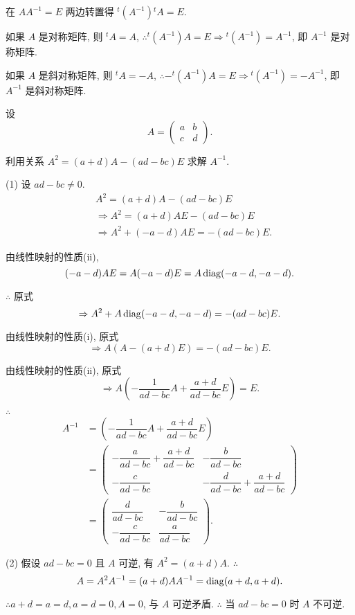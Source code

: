 \documentclass[color=black,device=normal,lang=cn,mode=geye]{elegantnote}
\begin{document}
\begin{solution}
    在 $AA^{-1}=E$ 两边转置得 ${}^t(A^{-1}){}^tA=E$.

    如果 $A$ 是对称矩阵, 则 ${}^tA=A$, $\therefore{}^t(A^{-1})A=E\Rightarrow{}^t(A^{-1})=A^{-1}$, 即 $A^{-1}$ 是对称矩阵.

    如果 $A$ 是斜对称矩阵, 则 ${}^tA=-A$, $\therefore-{}^t(A^{-1})A=E\Rightarrow{}^t(A^{-1})=-A^{-1}$, 即 $A^{-1}$ 是斜对称矩阵.
\end{solution}
\setcounter{exercise}{13}
\begin{exercise}%
    设
    \[A=\begin{pmatrix}
        a & b \\
        c & d
    \end{pmatrix}.\]
    
    利用关系 $A^2=(a+d)A-(ad-bc)E$ 求解 $A^{-1}$.
\end{exercise}
\begin{solution}
    (1) 设 $ad-bc\neq0$.
    \begin{align*}
        & A^2=(a+d)A-(ad-bc)E \\
        & \Rightarrow A^2=(a+d)AE-(ad-bc)E \\
        & \Rightarrow A^2+(-a-d)AE=-(ad-bc)E.
    \end{align*}

    由线性映射的性质(ii),
    \[(-a-d)AE=A(-a-d)E=A\operatorname{diag}(-a-d,-a-d).\]

    $\therefore$ 原式
    \[\Rightarrow A^2+A\operatorname{diag}(-a-d,-a-d)=-(ad-bc)E.\]

    由线性映射的性质(i), 原式
    \[\Rightarrow A(A-(a+d)E)=-(ad-bc)E.\]

    由线性映射的性质(ii), 原式
    \[\Rightarrow A\left(-\dfrac{1}{ad-bc}A+\dfrac{a+d}{ad-bc}E\right)=E.\]

    $\therefore$
    \begin{align*}
        A^{-1} & =\left(-\dfrac{1}{ad-bc}A+\dfrac{a+d}{ad-bc}E\right) \\
        & =\begin{pmatrix}
            -\dfrac{a}{ad-bc}+\dfrac{a+d}{ad-bc} & -\dfrac{b}{ad-bc} \\[8pt]
            -\dfrac{c}{ad-bc} & -\dfrac{d}{ad-bc}+\dfrac{a+d}{ad-bc}
        \end{pmatrix} \\
        & =\begin{pmatrix}
            \dfrac{d}{ad-bc} & -\dfrac{b}{ad-bc} \\[8pt]
            -\dfrac{c}{ad-bc} & \dfrac{a}{ad-bc}
        \end{pmatrix}.
    \end{align*}

    (2) 假设 $ad-bc=0$ 且 $A$ 可逆, 有 $A^2=(a+d)A$. $\therefore$
    \[A=A^2A^{-1}=(a+d)AA^{-1}=\operatorname{diag}(a+d,a+d).\]

    $\therefore a+d=a=d,a=d=0,A=0$, 与 $A$ 可逆矛盾. $\therefore$ 当 $ad-bc=0$ 时 $A$ 不可逆.
\end{solution}
\end{document}
